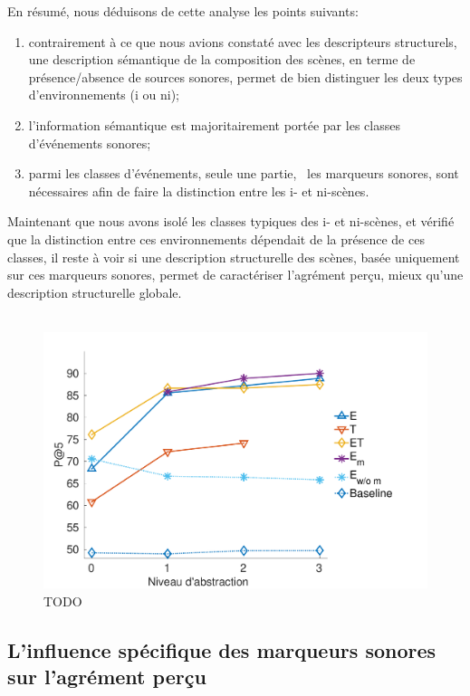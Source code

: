 En résumé, nous déduisons de cette analyse les points suivants:

\begin{enumerate}
\item contrairement à ce que nous avions constaté avec les descripteurs structurels, une description sémantique de la composition des scènes, en terme de présence/absence de sources sonores, permet de bien distinguer les deux types d'environnements (i ou ni);
\item l'information sémantique est majoritairement portée par les classes d'événements sonores;
\item parmi les classes d'événements, seule une partie, \ie~les marqueurs sonores, sont nécessaires afin de faire la distinction entre les i- et ni-scènes.
\end{enumerate}

Maintenant que nous avons isolé les classes typiques des i- et ni-scènes, et vérifié que la distinction entre ces environnements dépendait de la présence de ces classes, il reste à voir si une description structurelle des scènes, basée uniquement sur ces marqueurs sonores, permet de caractériser l'agrément perçu, mieux qu'une description structurelle globale. \\

\\

\begin{figure}[t]
        \myfloatalign
        \includegraphics[width=.8\linewidth]{gfx/ch_5/pa5_1}
       \caption[TODO]{TODO}\label{fig:pa5}
\end{figure}

\subsection{L'influence spécifique des marqueurs sonores sur l'agrément perçu}

